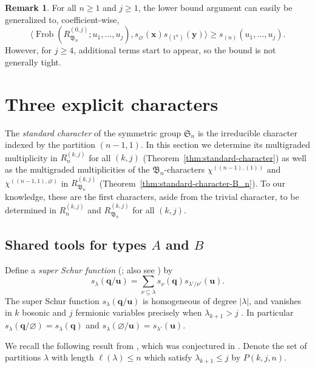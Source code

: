 \documentclass[12pt]{amsart}
\theoremstyle{plain}
\theoremstyle{definition}
\newtheorem{remark}[theorem]{Remark}
\DeclareMathOperator{\Frob}{Frob}
\newcommand{\x}{\mathbf{x}}
\newcommand{\y}{\mathbf{y}}
\begin{document}
\begin{remark}\label{rem:general-j-lower-bound}
    For all $n \geq 1$ and $j \geq 1$, the lower bound argument can easily be generalized to, coefficient-wise,
    \begin{equation}
        \langle \Frob(R_{\mathfrak{B}_n}^{(0,j)}; u_1,\ldots,u_j), s_{\varnothing}(\x) s_{(1^n)}(\y)\rangle \geq s_{(n)}(u_1,\ldots,u_j).
    \end{equation}
    However, for $j \geq 4$, additional terms start to appear, so the bound is not generally tight.
\end{remark}

\section{Three explicit characters}\label{sec:standard}

The \emph{standard character} of the symmetric group $\mathfrak{S}_n$ is the irreducible character indexed by the partition $(n-1,1)$. 
In this section we determine its multigraded multiplicity in $R_n^{(k,j)}$ for all $(k,j)$ (Theorem~\ref{thm:standard-character}) 
as well as the multigraded multiplicities of the $\mathfrak{B}_n$-characters $\chi^{((n-1),(1))}$ and $\chi^{((n-1,1), \varnothing)}$ in $R_{\mathfrak{B}_n}^{(k,j)}$ (Theorem~\ref{thm:standard-character-B_n}).
To our knowledge, these are the first characters, aside from the trivial character, to be determined in $R_n^{(k,j)}$ and $R_{\mathfrak{B}_n}^{(k,j)}$ for all $(k,j)$.

\subsection{Shared tools for types \texorpdfstring{$A$}{A} and \texorpdfstring{$B$}{B}} 
Define a \emph{super Schur function} (\cite{BereleRegev}; also see \cite[Appendix A.2.2]{ChengWangBook}) by 
\begin{equation}
    s_\lambda(\mathbf{q}/\mathbf{u}) = \sum_{\nu \subseteq \lambda} s_\nu(\mathbf{q}) s_{\lambda'/\nu'}(\mathbf{u}).
\end{equation}
The super Schur function $s_\lambda(\mathbf{q}/\mathbf{u})$ is homogeneous of degree $|\lambda|$, and vanishes in $k$ bosonic and $j$ fermionic variables precisely when $\lambda_{k+1} > j$ \cite{BereleRegev}.
In particular $s_\lambda(\mathbf{q}/\varnothing) = s_\lambda(\mathbf{q})$ and $s_\lambda(\varnothing/\mathbf{u}) = s_{\lambda'}(\mathbf{u})$.

We recall the following result from \cite{Lentfer-Supersymmetry}, which was conjectured in \cite[Conjecture 1]{Bergeron2020}.
Denote the set of partitions $\lambda$ with length $\ell(\lambda) \leq n$ which satisfy $\lambda_{k+1} \leq j$ by $P(k,j,n)$.
\end{document}
